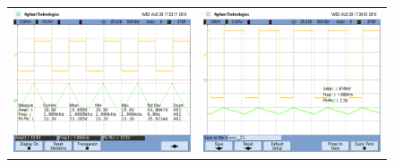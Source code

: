 \begin{figure}[H]
	\centering
	\begin{tabular}{c c}
		\includegraphics[scale=0.2]{Integrador/Mediciones/Osciloscopio/PCB_Compensado/osc_15.png} &
		\includegraphics[scale=0.2]{Integrador/Mediciones/Osciloscopio/PCB_Compensado/osc_16.png} \\

\end{tabular}
\end{figure}
